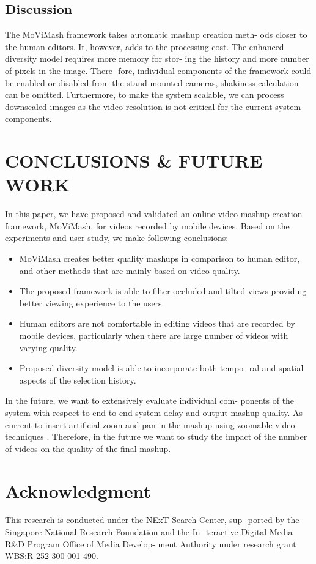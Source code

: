 \documentclass{sig-alternate}
\begin{document}
\subsection{Discussion}
The MoViMash framework takes automatic mashup creation meth-
ods closer to the human editors. It, however, adds to the processing
cost. The enhanced diversity model requires more memory for stor-
ing the history and more number of pixels in the image. There-
fore, individual components of the framework could be enabled or
disabled from the stand-mounted cameras,
shakiness calculation can be omitted. Furthermore, to make the
system scalable, we can process downscaled images as the video
resolution is not critical for the current system components.

\section{CONCLUSIONS & FUTURE WORK}
In this paper, we have proposed and validated an online video
mashup creation framework, MoViMash, for videos recorded by
mobile devices. Based on the experiments and user study, we make
following conclusions:

\begin{itemize}
    \item MoViMash creates better quality mashups in comparison to
human editor, and other methods that are mainly based on
video quality.
    \item The proposed framework is able to filter occluded and tilted
views providing better viewing experience to the users.
    \item Human editors are not comfortable in editing videos that are
recorded by mobile devices, particularly when there are large
number of videos with varying quality.
    \item Proposed diversity model is able to incorporate both tempo-
ral and spatial aspects of the selection history.
\end{itemize}

In the future, we want to extensively evaluate individual com-
ponents of the system with respect to end-to-end system delay and
output mashup quality. As current to insert artificial zoom and pan in the
mashup using zoomable video techniques \cite{11}. Therefore, in the future we want
to study the impact of the number of videos on the quality of the
final mashup.

\section{Acknowledgment}
This research is conducted under the NExT Search Center, sup-
ported by the Singapore National Research Foundation and the In-
teractive Digital Media R&D Program Office of Media Develop-
ment Authority under research grant WBS:R-252-300-001-490.



\end{document}
